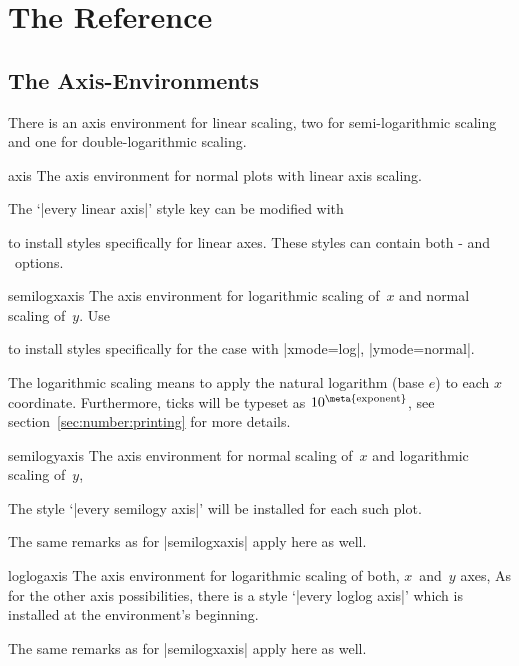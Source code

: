 
\section{The Reference}

\subsection{The Axis-Environments}
There is an axis environment for linear scaling, two for semi-logarithmic scaling and one for double-logarithmic scaling.
\begin{environment}{{axis}}
	The axis environment for normal plots with linear axis scaling.

	The `|every linear axis|' style key can be modified with
\begin{codeexample}
\end{codeexample}
to install styles specifically for linear axes. These styles can contain both \Tikz- and \PGFPlots\ options.
\end{environment}

\begin{environment}{{semilogxaxis}}
The axis environment for logarithmic scaling of~$x$ and normal scaling of~$y$.
Use
\begin{codeexample}
\end{codeexample}
to install styles specifically for the case with |xmode=log|, |ymode=normal|.

The logarithmic scaling means to apply the natural logarithm (base $e$) to each $x$ coordinate. Furthermore, ticks will be typeset as $10^{\text{\meta{exponent}}}$, see section~\ref{sec:number:printing} for more details.
\end{environment}

\begin{environment}{{semilogyaxis}}
The axis environment for normal scaling of~$x$ and logarithmic scaling of~$y$,

The style `|every semilogy axis|' will be installed for each such plot.

The same remarks as for |semilogxaxis| apply here as well.
\end{environment}

\begin{environment}{{loglogaxis}}
The axis environment for logarithmic scaling of both, $x$~and~$y$ axes,
As for the other axis possibilities, there is a style `|every loglog axis|' which is installed at the environment's beginning.

The same remarks as for |semilogxaxis| apply here as well.
\end{environment}

